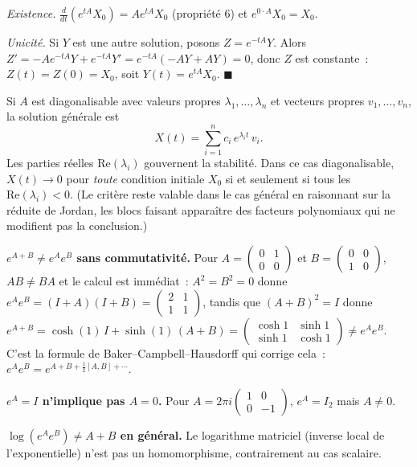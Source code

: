 \begin{mdframed}[style=proofbar]
  \textit{Existence.} $\frac{d}{dt}(e^{tA}X_0) = Ae^{tA}X_0$ (propriété 6) et
  $e^{0\cdot A}X_0 = X_0$.

  \textit{Unicité.} Si $Y$ est une autre solution, posons $Z = e^{-tA}Y$.
  Alors $Z' = -Ae^{-tA}Y + e^{-tA}Y' = e^{-tA}(-AY+AY) = 0$, donc $Z$ est
  constante~: $Z(t)=Z(0)=X_0$, soit $Y(t)=e^{tA}X_0$. \hfill$\blacksquare$
\end{mdframed}

Si $A$ est diagonalisable avec valeurs propres $\lambda_1,\ldots,\lambda_n$
et vecteurs propres $v_1,\ldots,v_n$, la solution générale est
\[
  X(t) = \sum_{i=1}^n c_i\,e^{\lambda_i t}\,v_i.
\]
Les parties réelles $\mathrm{Re}(\lambda_i)$ gouvernent la stabilité. Dans ce
cas diagonalisable, $X(t)\to 0$ pour \emph{toute} condition initiale $X_0$
si et seulement si tous les $\mathrm{Re}(\lambda_i) < 0$.
(Le critère reste valable dans le cas général en raisonnant sur la réduite de
Jordan, les blocs faisant apparaître des facteurs polynomiaux qui ne modifient
pas la conclusion.)

\decsep{}



\begin{mdframed}[style=cexbar]
  \textbf{$e^{A+B} \neq e^A e^B$ sans commutativité.}\enspace%
  Pour $A=\begin{pmatrix}0&1\\0&0\end{pmatrix}$ et $B=\begin{pmatrix}0&0\\1&0\end{pmatrix}$,
  $AB\neq BA$ et le calcul est immédiat~: $A^2=B^2=0$ donne
  $e^Ae^B = (I+A)(I+B) = \begin{pmatrix}2&1\\1&1\end{pmatrix}$, tandis que
  ${(A+B)}^2 = I$ donne
  $e^{A+B} = \cosh(1)\,I + \sinh(1)\,(A+B)
  = \begin{pmatrix}\cosh 1&\sinh 1\\\sinh 1&\cosh 1\end{pmatrix} \neq e^Ae^B$.
  C'est la formule de Baker--Campbell--Hausdorff
  qui corrige cela~: $e^Ae^B = e^{A+B+\frac{1}{2}[A,B]+\cdots}$.

  \smallskip\noindent
  \textbf{$e^A = I$ n'implique pas $A = 0$.}\enspace%
  Pour $A = 2\pi i \begin{pmatrix}1&0\\0&-1\end{pmatrix}$,
  $e^A = I_2$ mais $A\neq 0$.

  \smallskip\noindent
  \textbf{$\log(e^A e^B) \neq A + B$ en général.}\enspace%
  Le logarithme matriciel (inverse local de l'exponentielle) n'est pas
  un homomorphisme, contrairement au cas scalaire.
\end{mdframed}

